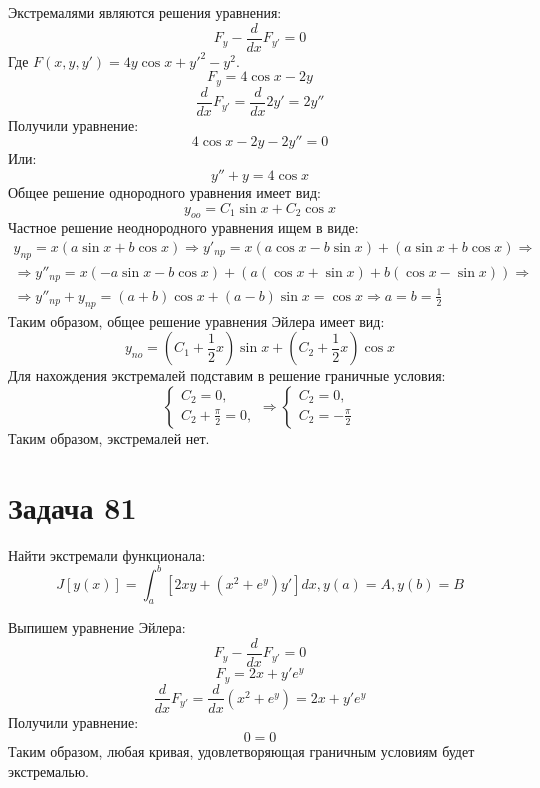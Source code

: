 \documentclass[11pt]{article}
\begin{document}
Экстремалями являются решения уравнения:
$$F_y - \frac{d}{dx}F_{y'} = 0$$
Где \(F(x, y, y') = 4y\cos x + y'^2 - y^2\).
$$F_y = 4\cos x - 2y$$
$$\frac{d}{dx}F_{y'} = \frac{d}{dx}2y' = 2y''$$
Получили уравнение:
$$4\cos x - 2y - 2y'' = 0$$
Или:
$$y'' + y = 4\cos x$$
Общее решение однородного уравнения имеет вид:
$$y_{oo} = C_1\sin x + C_2\cos x$$
Частное решение неоднородного уравнения ищем в виде:
\begin{multline*}
y_{np} = x(a\sin x + b\cos x) \Rightarrow y'_{np} = x(a\cos x - b\sin x) + (a\sin x + b\cos x) \Rightarrow\\
\Rightarrow y''_{np} = x(-a\sin x - b\cos x) + (a(\cos x + \sin x) + b(\cos x - \sin x)) \Rightarrow\\
\Rightarrow y''_{np} + y_{np} = (a + b)\cos x + (a - b)\sin x = \cos x \Rightarrow a = b = \frac{1}2
\end{multline*}
Таким образом, общее решение уравнения Эйлера имеет вид:
$$y_{no} = \left(C_1 + \frac{1}2x\right)\sin x + \left(C_2 + \frac{1}2x\right)\cos x$$
Для нахождения экстремалей подставим в решение граничные условия:
\begin{equation*}
\begin{cases}
C_2 = 0, \\
C_2 + \frac{\pi}2 = 0,
\end{cases}
\Rightarrow
\begin{cases}
C_2 = 0, \\
C_2 = -\frac{\pi}2
\end{cases}
\end{equation*}
Таким образом, экстремалей нет.
\section{Задача 81}
\label{sec:org98b6363}
Найти экстремали функционала:
$$J[y(x)] = \int_a^b[2xy + (x^2 + e^y)y']dx, y(a) = A, y(b) = B$$

Выпишем уравнение Эйлера:
$$F_y - \frac{d}{dx}F_{y'} = 0$$
$$F_y = 2x + y'e^y$$
$$\frac{d}{dx}F_{y'} = \frac{d}{dx}(x^2 + e^y) = 2x + y'e^y$$
Получили уравнение:
$$0 = 0$$
Таким образом, любая кривая, удовлетворяющая граничным условиям будет экстремалью.
\end{document}
